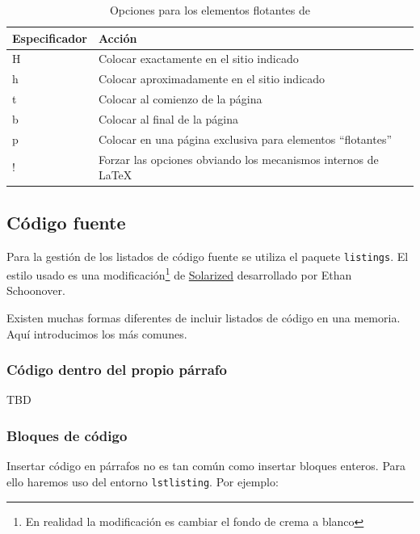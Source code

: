 \begin{table}
    \caption{\label{tab:floats-options}Opciones para los elementos flotantes de }
    \centering
    \begin{tabularx}{\textwidth}{@{}lX@{}}
        \toprule
        \textbf{Especificador} & \textbf{Acción} \\
        \midrule
        H & Colocar exactamente en el sitio indicado                       \\
        h & Colocar aproximadamente en el sitio indicado                   \\
        t & Colocar al comienzo de la página                               \\
        b & Colocar al final de la página                                  \\
        p & Colocar en una página exclusiva para elementos ``flotantes''   \\
        ! & Forzar las opciones obviando los mecanismos internos de \LaTeX \\
    \bottomrule
    \end{tabularx}
\end{table}

\subsection{Código fuente}

Para la gestión de los listados de código fuente se utiliza el paquete \texttt{listings}. El estilo usado es una modificación\footnote{En realidad la modificación es cambiar el fondo de crema a blanco} de \href{https://ethanschoonover.com/solarized/}{Solarized} desarrollado por Ethan Schoonover.

Existen muchas formas diferentes de incluir listados de código en una memoria. Aquí introducimos los más comunes.

\subsubsection{Código dentro del propio párrafo}

TBD

\subsubsection{Bloques de código}

Insertar código en párrafos no es tan común como insertar bloques enteros. Para ello haremos uso del entorno \texttt{lstlisting}. Por ejemplo:

